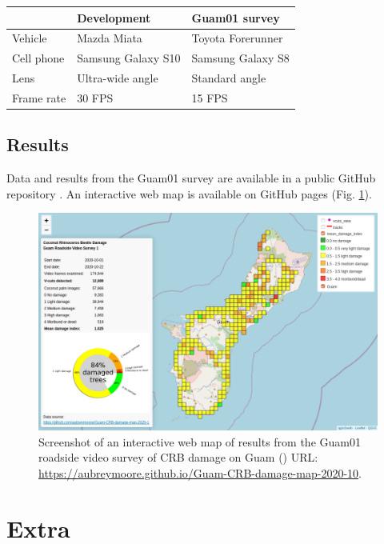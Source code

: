 \documentclass[12pt,letterpaper,english,bibliography=totocnumbered, abstract=on]{scrartcl}
\begin{document}
\begin{tabular}{|l|l|l|}
	\hline 
	& \textbf{Development} & \textbf{Guam01 survey} \\ 
	\hline 
	Vehicle & Mazda Miata & Toyota Forerunner \\ 
	\hline 
	Cell phone & Samsung Galaxy S10 & Samsung Galaxy S8 \\ 
    \hline 
	Lens & Ultra-wide angle & Standard angle \\
	\hline
	Frame rate & 30 FPS & 15 FPS \\
\hline
\end{tabular} 

\subsection{Results}

Data and results from the Guam01 survey are available in a public GitHub repository \cite{mooreGitHubRepositoryGuamCRBdamagemap2020102020}. An interactive web map is available on GitHub pages (Fig. \ref{fig:guam01webmap}).

\begin{figure}[H]
	\centering
	\includegraphics[width=\linewidth]{images/Guam01-webmap}
	\caption{Screenshot of an interactive web map of results from the Guam01 roadside video survey of CRB damage on Guam (\cite{mooreWebMapGuamCRBdamagemap2020102020}) URL: \url{https://aubreymoore.github.io/Guam-CRB-damage-map-2020-10}.}
	\label{fig:guam01webmap}
\end{figure}


\section{Extra}

\cite{aubreymooreSetAutomatedRoadside2020}

\cite{onepanelinc.AIPipelineOperations2020}

\cite{onepanelinc.ScopeWorkObject2020}

\printbibliography	
\end{document}
